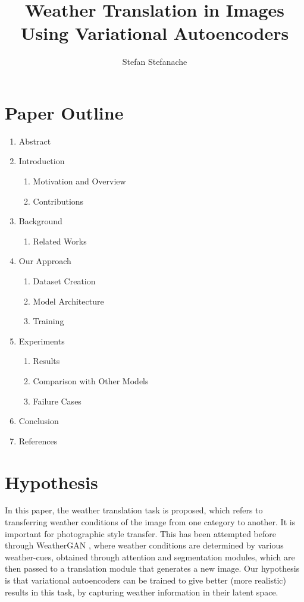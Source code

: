 \documentclass[11pt]{article}
\title{\textbf{Weather Translation in Images Using Variational Autoencoders}}
\author{Stefan Stefanache}
\begin{document}
    \maketitle

    \section{Paper Outline}
    \begin{enumerate}
        \item Abstract
        \item Introduction
            \begin{enumerate}
                \item Motivation and Overview
                \item Contributions
            \end{enumerate}
        \item Background
            \begin{enumerate}
                \item Related Works
            \end{enumerate}
        \item Our Approach
            \begin{enumerate}
                \item Dataset Creation
                \item Model Architecture
                \item Training
            \end{enumerate}
        \item Experiments
            \begin{enumerate}
                \item Results
                \item Comparison with Other Models
                \item Failure Cases
            \end{enumerate}
        \item Conclusion
        \item References
    \end{enumerate}

    \section{Hypothesis}

    In this paper, the weather translation task is proposed, which refers to transferring weather conditions of 
    the image from one category to another. It is important for photographic style transfer. This has been 
    attempted before through WeatherGAN \cite{DBLP:journals/corr/abs-2103-05422}, where weather conditions
    are determined by various weather-cues, obtained through attention and segmentation modules, which
    are then passed to a translation module that generates a new image. Our hypothesis is that variational 
    autoencoders can be trained to give better (more realistic) results in this task, by capturing weather 
    information in their latent space.
\end{document}
